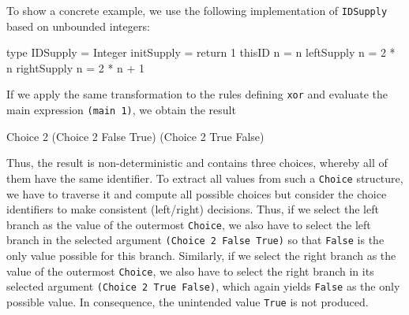 \documentclass{llncs}
\newcommand{\code}[1]{\mbox{\small\texttt{#1}}}
\begin{document}
To show a concrete example, we use the following implementation
of \code{IDSupply} based on unbounded integers:
%
\begin{haskell}
  type IDSupply = Integer
  initSupply    = return 1
  thisID      n = n
  leftSupply  n = 2 * n
  rightSupply n = 2 * n + 1
\end{haskell}
%
If we apply the same transformation to the rules defining \code{xor}
and evaluate the main expression \code{(main 1)},
we obtain the result
\begin{haskell}
  Choice 2 (Choice 2 False True) (Choice 2 True False)
\end{haskell}
Thus, the result is non-deterministic and contains three choices,
whereby all of them have the same identifier.
To extract all values from such a \code{Choice} structure,
we have to traverse it and  compute all possible choices
but consider the choice identifiers to make consistent (left/right)
decisions.
Thus, if we select the left branch as the value
of the outermost \code{Choice}, we also have to select the left branch
in the selected argument \code{(Choice 2 False True)} so that \code{False}
is the only value possible for this branch.
Similarly, if we select the right branch as the value of the outermost
\code{Choice}, we also have to select the right branch in
its selected argument \code{(Choice 2 True False)}, which again yields 
\code{False} as the only possible value. In consequence, 
the unintended value \code{True} is not produced.
\end{document}
